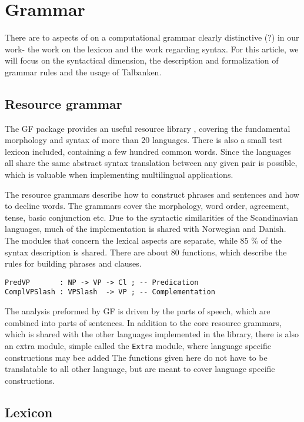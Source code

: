 \documentclass[runningheads,a4paper]{llncs}
\begin{document}
\section{Grammar}

There are to aspects of on a computational grammar clearly distinctive (?)  in
our work- the work on the lexicon and the work regarding syntax.
For this article, we will focus on the syntactical dimension, the description
and formalization of grammar rules and the usage of Talbanken.

\subsection{Resource grammar}

The GF package provides an useful resource library \cite{gf-resource}, covering the
fundamental morphology and syntax of more than 20 languages.
There is also a small test lexicon included, containing a few hundred common
words.
Since the languages all share the same abstract syntax translation between any given
pair is possible, which is valuable
when implementing multilingual applications.

The resource grammars describe how to construct phrases and sentences and how to
decline words. The grammars cover the morphology,
word order, agreement, tense, basic conjunction etc.
Due to the syntactic similarities of the Scandinavian languages, much of the implementation
is shared with Norwegian and Danish. The modules that concern the lexical
aspects are separate, while 85 \% of the syntax description is shared.
There are about 80 functions, which describe the rules for building phrases and clauses.
\begin{verbatim}
PredVP       : NP -> VP -> Cl ; -- Predication
ComplVPSlash : VPSlash  -> VP ; -- Complementation
\end{verbatim}
The analysis preformed by GF is driven by the parts of speech, which are combined into
parts of sentences.
In addition to the core resource grammars, which is shared with the other languages implemented in the
library, there is also an extra module, simple called the \verb|Extra| module, where
 language specific constructions may bee added
The functions given here do not have to be translatable
to all other language, but are meant to cover language specific constructions.


\subsection{Lexicon}
\end{document}
